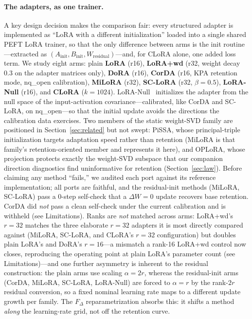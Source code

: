 \documentclass[11pt]{article}
\newcommand{\dw}{F_{\Delta}}
\begin{document}
\paragraph{The adapters, as one trainer.} A key design decision makes the
comparison fair: every structured adapter is implemented as ``LoRA with a different
initialization'' loaded into a single shared PEFT LoRA trainer, so that the only
difference between arms is the init routine---extracted as $(A_{\text{init}},
B_{\text{init}}, W_{\text{residual}})$---and, for CLoRA alone, one added loss term.
We study eight arms: plain \textbf{LoRA} (r16), \textbf{LoRA{+}wd} (r32, weight
decay 0.3 on the adapter matrices only), \textbf{DoRA} (r16), \textbf{CorDA} (r16,
KPA retention mode, nq\_open calibration), \textbf{MiLoRA} (r32), \textbf{SC-LoRA}
(r32, $\beta{=}0.5$), \textbf{LoRA-Null} (r16), and \textbf{CLoRA} ($k{=}1024$).
LoRA-Null~\citep{tang2025loranull} initializes the adapter from the null space of
the input-activation covariance---calibrated, like CorDA and SC-LoRA, on
nq\_open---so that the initial update avoids the directions the calibration data
exercises. Two members of the static weight-SVD family are positioned in
Section~\ref{sec:related} but not swept: PiSSA, whose principal-triple
initialization targets adaptation speed rather than retention (MiLoRA is that
family's retention-oriented member and represents it here), and OPLoRA, whose
projection protects exactly the weight-SVD subspace that our companion
direction diagnostics find uninformative for retention
(Section~\ref{sec:law}).
Before claiming any method ``fails,'' we audited each port against its reference
implementation; all ports are faithful, and the residual-init methods (MiLoRA,
SC-LoRA) pass a 0-step self-check that a $\Delta W = 0$ update recovers base
retention. CorDA did \emph{not} pass a clean self-check under the current
calibration and is withheld (see Limitations). Ranks are \emph{not}
matched across arms: LoRA{+}wd's $r{=}32$ matches the three elaborate $r{=}32$
adapters it is most directly compared against (MiLoRA, SC-LoRA, and CLoRA's
$r{=}32$ configuration) but doubles plain LoRA's and DoRA's $r{=}16$---a
mismatch a rank-16 LoRA{+}wd control now closes, reproducing the operating
point at plain LoRA's parameter count (see Limitations)---and one further asymmetry is
inherent to the residual construction: the plain arms use scaling $\alpha\!=\!2r$,
whereas the residual-init arms (CorDA, MiLoRA, SC-LoRA, LoRA-Null) are forced to
$\alpha\!=\!r$ by the rank-$2r$ residual conversion, so a fixed nominal learning
rate maps to a different update growth per family. The $\dw$ reparametrization
absorbs this: it shifts a method \emph{along} the learning-rate grid, not off the
retention curve.
\end{document}
